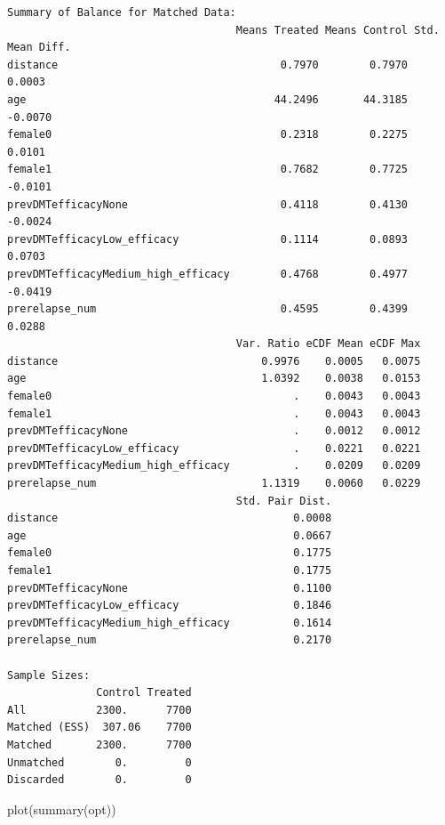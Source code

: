 \documentclass[
  letterpaper,
  DIV=11,
  numbers=noendperiod]{scrreprt}
\newenvironment{Shaded}{\begin{snugshade}}{\end{snugshade}}
\newcommand{\FunctionTok}[1]{\textcolor[rgb]{0.28,0.35,0.67}{#1}}
\newcommand{\NormalTok}[1]{\textcolor[rgb]{0.00,0.23,0.31}{#1}}
\begin{document}
\begin{verbatim}
Summary of Balance for Matched Data:
                                    Means Treated Means Control Std. Mean Diff.
distance                                   0.7970        0.7970          0.0003
age                                       44.2496       44.3185         -0.0070
female0                                    0.2318        0.2275          0.0101
female1                                    0.7682        0.7725         -0.0101
prevDMTefficacyNone                        0.4118        0.4130         -0.0024
prevDMTefficacyLow_efficacy                0.1114        0.0893          0.0703
prevDMTefficacyMedium_high_efficacy        0.4768        0.4977         -0.0419
prerelapse_num                             0.4595        0.4399          0.0288
                                    Var. Ratio eCDF Mean eCDF Max
distance                                0.9976    0.0005   0.0075
age                                     1.0392    0.0038   0.0153
female0                                      .    0.0043   0.0043
female1                                      .    0.0043   0.0043
prevDMTefficacyNone                          .    0.0012   0.0012
prevDMTefficacyLow_efficacy                  .    0.0221   0.0221
prevDMTefficacyMedium_high_efficacy          .    0.0209   0.0209
prerelapse_num                          1.1319    0.0060   0.0229
                                    Std. Pair Dist.
distance                                     0.0008
age                                          0.0667
female0                                      0.1775
female1                                      0.1775
prevDMTefficacyNone                          0.1100
prevDMTefficacyLow_efficacy                  0.1846
prevDMTefficacyMedium_high_efficacy          0.1614
prerelapse_num                               0.2170

Sample Sizes:
              Control Treated
All           2300.      7700
Matched (ESS)  307.06    7700
Matched       2300.      7700
Unmatched        0.         0
Discarded        0.         0
\end{verbatim}

\begin{Shaded}
\begin{Highlighting}[]
\FunctionTok{plot}\NormalTok{(}\FunctionTok{summary}\NormalTok{(opt))}
\end{Highlighting}
\end{Shaded}
\end{document}
